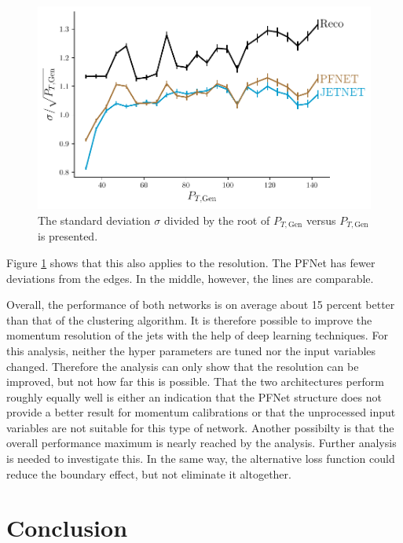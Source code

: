 \documentclass[12pt, a4paper]{thesis}
\begin{document}
\begin{figure}[hbtp]
  \centering
  \includegraphics[width=.9\linewidth]{../images/comp_res.pdf}
  \caption{The standard deviation $\sigma$ divided by the root of \(P_{T, \text{Gen}}\)
    versus \(P_{T, \text{Gen}}\) is presented.}
  \label{comp_res}
\end{figure}

Figure \ref{comp_res} shows that this also applies to the
resolution. The PFNet has fewer deviations from the edges. In the
middle, however, the lines are comparable.

Overall, the performance of both networks is on average about 15
percent better than that of the clustering algorithm.  It is therefore
possible to improve the momentum resolution of the jets with the help
of deep learning techniques.  For this analysis, neither the hyper
parameters are tuned nor the input variables changed. Therefore the
analysis can only show that the resolution can be improved, but not
how far this is possible. That the two architectures perform roughly
equally well is either an indication that the PFNet structure does not
provide a better result for momentum calibrations or that the
unprocessed input variables are not suitable for this type of
network. Another possibilty is that the overall performance maximum is
nearly reached by the analysis. Further analysis is needed to
investigate this.  In the same way, the alternative loss function
could reduce the boundary effect, but not eliminate it altogether.


\chapter{Conclusion}
\label{sec:org62a45ca}

\end{document}
